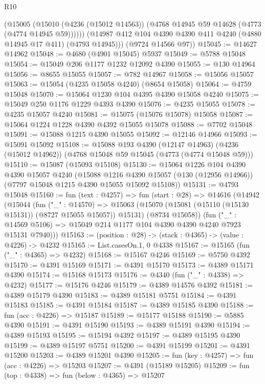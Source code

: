 \begin{lexlean}{R10}
\begin{coremodule}
          (@15005
            (@15010 (@4236 (@15012 @14563)) (@4768 @14945 @59 @14628 (@4773 (@4774 @14945 @59))))))
        (@14987 @412 @104 @4390 @4390 @411 @4240 (@4880 @14945 @17 @411) (@4793 @14945)))
      (@9724 @14566 @97))
@15045 := @14627 @14962
@15048 := @4680 (@4901 @15045) @5937
@15049 := @5788 @15048
@15054 := @15049 @206 @1177 @1232 @12092 @4390
@15055 := @130 @14964
@15056 := @8655 @15055
@15057 := @782 @14967
@15058 := @15056 @15057
@15063 := @15054 (@4235 @15058 @4240) (@8654 @15058)
@15064 := @4759 @15048
@15070 := @15064 @1230 @104 @4395 @4390 @15058 @4240
@15075 := @15049 @250 @1176 @1229 @4393 @4390
@15076 := @4235 @15055
@15078 := @4235 @15057 @4240
@15081 := @15075 (@15076 @15078) @15058
@15087 := @15064 @1224 @1228 @4390 @4392 @15055 @15078
@15088 := @7702 @15048
@15091 := @15088 @1215 @4390 @15055
@15092 := @12146 @14966
@15093 := @15091 @15092
@15108 := @15088
    @193
    @4390
    (@12147 @14963)
    (@4236 (@15012 @14962))
    (@4768 @15048 @59 @15045 (@4773 (@4774 @15048 @59)))
@15110 := @15087 (@15093 @15108)
@15130 := @15064
    @1226
    @104
    @4390
    @4390
    @15057
    @4240
    (@15088
      @1216
      @4390
      @15057
      (@130 (@12956 @14966))
      (@7797 @15048 @1215 @4390 @15055 @15092 @15108))
@15131 := @4793 @15048
@15160 := fun (text : @4257) =>
  fun (start : @28) =>
  @14616
    (@14942
      (@15044
        (fun ("_" : @14570) =>
        @15063
          (@15070 (@15081 (@15110 (@15130 @15131)) (@8727 @15055 @15057)) @15131)
          (@8734 @15058))
        (fun ("_" : @14569 @5106) => @15049 @214 @1177 @104 @4390 @4390 @4240 @7923 @15131 @7940)))
@15163 := (position : @28) -> (stack : @4365) -> (value : @4226) -> @4232
@15165 := List.casesOn.{1, 0} @4338
@15167 := @15165 (fun ("_" : @4365) => @4232)
@15168 := @15167 @4246
@15169 := @5750 @4392
@15170 := @4391 @15169
@15171 := @4391 @15170
@15173 := @4389 @15171 @4390
@15174 := @15168 @15173
@15176 := @4340 (fun ("_" : @4338) => @4232)
@15177 := @15176 @4246
@15179 := @4389 @14576 @4392
@15181 := @4389 @15179 @4390
@15183 := @4389 @15181 @5751
@15184 := @4391 @15183
@15185 := @4391 @15184
@15187 := @4389 @15185 @4390
@15188 := fun (acc : @4226) => @15187
@15189 := @15177 @15188
@15190 := @5885 @4390
@15191 := @4391 @15190
@15193 := @4389 @15191 @4390
@15194 := @4389 @15193
@15195 := @15194 @4392
@15197 := @4389 @15195 @4390
@15199 := @4389 @15197 @5751
@15200 := @4391 @15199
@15201 := @4391 @15200
@15203 := @4389 @15201 @4390
@15205 := fun (key : @4257) => fun (acc : @4226) => @15203
@15207 := @4391 (@15189 @15205)
@15209 := fun (top : @4338) => fun (below : @4365) => @15207

\end{coremodule}
\end{lexlean}
